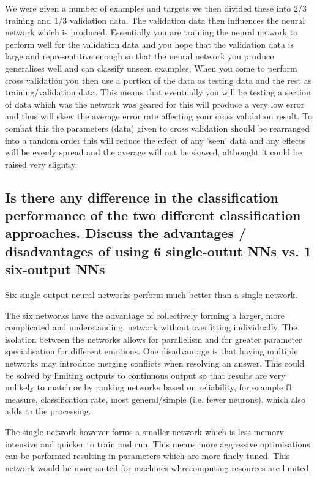 \documentclass[11pt]{article}
\begin{document}
We were given a number of examples and targets we then divided these into  2/3 training and 1/3 validation data. The validation data then influences the neural network which is produced. Essentially you are training the neural network to perform well for the validation data and you hope that the validation data is large and representitive enough so that the neural network you produce generalises well and can classify unseen examples. When you come to perform cross validation you then use a portion of the data as testing data and the rest as training/validation data. This means that eventually you will be testing a section of data which was the network was geared for this will produce a very low error and thus will skew the average error rate affecting your cross validation result. To combat this the parameters (data) given to cross validation should be rearranged into a random order this will reduce the effect of any 'seen' data and any effects will be evenly spread and the average will not be skewed, althought it could be raised very slightly.

\subsection{Is there any difference in the classification performance of the two different classification approaches. Discuss the advantages / disadvantages of using 6 single-outut NNs vs. 1 six-output NNs}

Six single output neural networks perform much better than a single network. 

The six networks have the advantage of collectively forming a larger, more complicated and understanding, network without overfitting individually. The isolation between the networks allows for parallelism and for greater parameter specialisation for different emotions. One disadvantage is that having multiple networks may introduce merging conflicts when resolving an answer. This could be solved by limiting outputs to continuous output so that results are very unlikely to match or by ranking networks based on reliability, for example f1 measure, classification rate, most general/simple (i.e. fewer neurons), which also adds to the processing.

The single network however forms a smaller network which is less memory intensive and quicker to train and run. This means more aggressive optimisations can be performed resulting in parameters which are more finely tuned. This network would be more suited for machines whrecomputing resources are limited.
\end{document}
